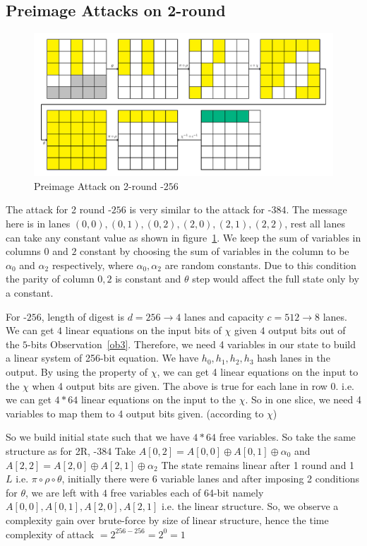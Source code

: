 \subsection{Preimage Attacks on 2-round }\label{section2RKeccak256}
    \begin{figure}
        \centering
        \includegraphics[scale=0.6]{2Rkeccak256.pdf}
        \caption{Preimage Attack on 2-round \KECCAK-$256$}
        \label{fig:2rkeccak256}
    \end{figure}
    The attack for 2 round \KECCAK-$256$ is very similar to the attack for \KECCAK-$384$.
    The message here is in lanes $(0, 0), (0, 1), (0, 2), (2, 0), (2, 1), (2, 2)$, rest all lanes can take any constant value as shown in figure~\ref{fig:2rkeccak256}. We keep the sum of variables in columns $0$ and $2$ constant by choosing the sum of variables in the column to be $\alpha_0$ and $\alpha_2$ respectively, where $\alpha_0, \alpha_2$ are random constants. Due to this condition the parity of column $0, 2$ is constant and $\theta$ step would affect the full state only by a constant.
    
    For \KECCAK-$256$, length of digest is $d = 256 \rightarrow 4$ lanes and capacity $c = 512 \rightarrow 8$ lanes. We can get $4$ linear equations on the input bits of $\chi$ given $4$ output bits out of the $5$-bits Observation~\ref{ob3}. Therefore, we need 4 variables in our state to build a linear system of 256-bit equation.    We have $h_0, h_1, h_2, h_3$  hash lanes in the output. By using the property of $\chi$, we can get 4 linear equations on the input to the $\chi$ when 4 output bits are given. The above is true for each lane in row 0. i.e. we can get $4*64$ linear equations on the input to the $\chi$. So in one slice, we need 4 variables to map them to 4 output bits given. (according to $\chi$) 
    
    So we build initial state such that we have $4*64$ free variables. So take the same structure as for 2R, \KECCAK-$384$
    Take $A[0, 2] = A[0, 0] \oplus A[0, 1] \oplus \alpha_0$
    and $A[2, 2] = A[2, 0] \oplus A[2, 1] \oplus \alpha_2$
    The state remains linear after 1 round and 1 $L$ i.e. $\pi \circ \rho \circ \theta$, initially there were 6 variable lanes and after imposing 2 conditions for $\theta$, we are left with $4$ free variables each of 64-bit namely $A[0,0], A[0,1], A[2, 0], A[2,1]$ i.e. the linear structure.
    So, we observe a complexity gain over brute-force by size of linear structure, hence the time complexity of attack $ = 2^{256 - 256} = 2^{0} = 1$
    
